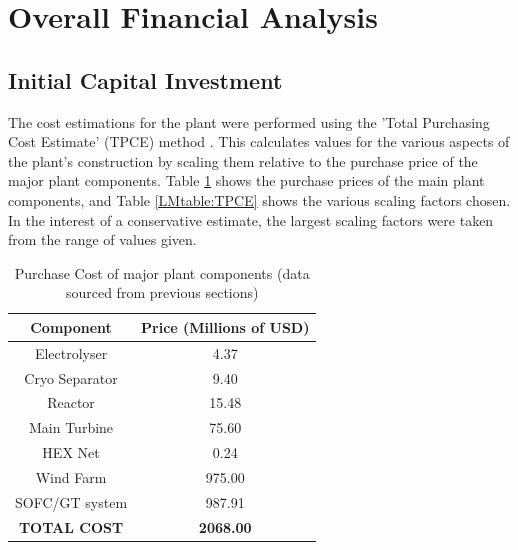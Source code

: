 \documentclass{article}
\begin{document}

\section{Overall Financial Analysis}
\label{LMCostsection}

\subsection{Initial Capital Investment}
The cost estimations for the plant were performed using the 'Total Purchasing Cost Estimate' (TPCE) method \cite{KLM}. This calculates values for the various aspects of the plant's construction by scaling them relative to the purchase price of the major plant components. Table \ref{LMtable:componentPC} shows the purchase prices of the main plant components, and Table \ref{LMtable:TPCE} shows the various scaling factors chosen. In the interest of a conservative estimate, the largest scaling factors were taken from the range of values given.


\begin{table}[h]
\centering
\caption{Purchase Cost of major plant components (data sourced from previous sections)}
\label{LMtable:componentPC}
\begin{tabular}{|c|c|}
\hline
\textbf{Component}  & \textbf{Price (Millions of USD)} \\ \hline
Electrolyser        & 4.37                             \\ \hline
Cryo Separator      & 9.40                             \\ \hline
Reactor             & 15.48                             \\ \hline
Main Turbine        & 75.60                            \\ \hline
HEX Net             & 0.24                             \\ \hline
Wind Farm           & 975.00                           \\ \hline
SOFC/GT system      & 987.91                           \\ \hline
\textbf{TOTAL COST} & \textbf{2068.00}                 \\ \hline
\end{tabular}
\end{table}
\end{document}
